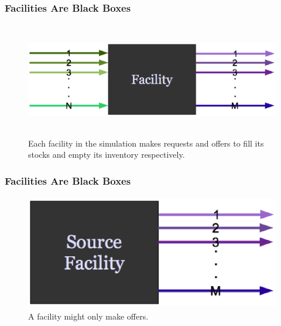 \begin{frame}[ctb!]
  \frametitle{Facilities Are Black Boxes}
  \begin{figure}[htbp!]
    \begin{center}
      \includegraphics[height=5cm]{facility.eps}
    \end{center}
    \caption{ Each facility in the simulation makes requests and offers 
    to fill its stocks and empty its inventory respectively.  }
    \label{fig:facility}
  \end{figure}
\end{frame}
\begin{frame}[ctb!]
  \frametitle{Facilities Are Black Boxes}
  \begin{figure}[htbp!]
    \begin{center}
      \includegraphics[height=5cm]{sourcefacility.eps}
    \end{center}
    \caption{ A facility might only make offers.} 
    \label{fig:sourcefacility}
  \end{figure}
\end{frame}

